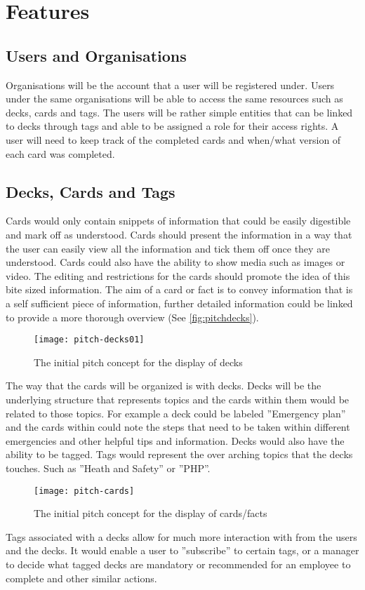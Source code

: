 \section{Features}
\subsection{Users and Organisations}
Organisations will be the account that a user will be registered under. Users under the same organisations will be able to access  the same resources such as decks, cards and tags. The users will be rather simple entities that can be linked to decks through tags and able to be assigned a role for their access rights. A user will need to keep track of the completed cards and when/what version of each card was completed.

\subsection{Decks, Cards and Tags}
Cards would only contain snippets of information that could be easily digestible and mark off as understood. Cards should present the information in a way that the user can easily view all the information and tick them off once they are understood. Cards could also have the ability to show media such as images or video. The editing and restrictions for the cards should promote the idea of this bite sized information. The aim of a card or fact is to convey information that is a self sufficient piece of information, further detailed information could be linked to provide a more thorough overview (See \ref{fig:pitchdecks}).

\begin{figure}[h]
\label{pitchdecks}
\texttt{[image: pitch-decks01]}
\caption{The initial pitch concept for the display of decks}
\centering
\end{figure}

The way that the cards will be organized is with decks. Decks will be the underlying structure that represents topics and the cards within them would be related to those topics. For example a deck could be labeled ”Emergency plan” and the cards within could note the steps that need to be taken within different emergencies and other helpful tips and information.
Decks would also have the ability to be tagged. Tags would represent the over arching topics that the decks touches. Such as ”Heath and Safety” or ”PHP”.
\begin{figure}
\label{pitchcards}
\texttt{[image: pitch-cards]}
\caption{The initial pitch concept for the display of cards/facts}
\centering
\end{figure}
Tags associated with a decks allow for much more interaction with from the users and the decks. It would enable a user to ”subscribe” to certain tags, or a manager to decide what tagged decks are mandatory or recommended for an employee to complete and other similar actions.



